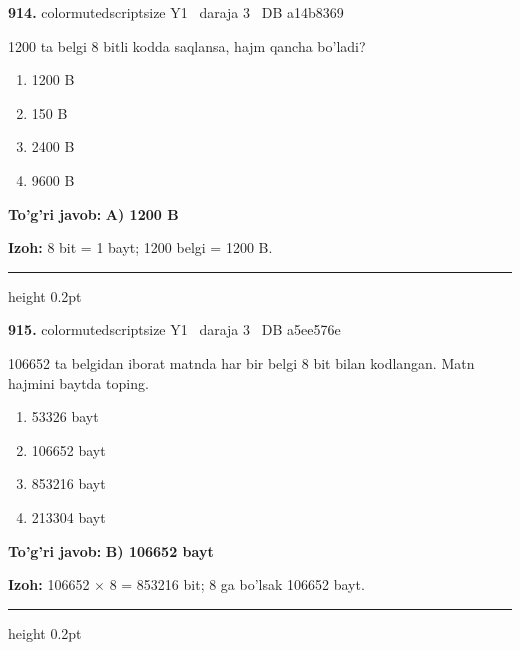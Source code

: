 \documentclass[10pt,a4paper,oneside]{article}
\begin{document}
\noindent\textbf{\color{ink}914.}  {color{muted}scriptsize Y1 \textbullet\ daraja 3 \textbullet\ DB a14b8369}
\par
1200 ta belgi 8 bitli kodda saqlansa, hajm qancha bo'ladi?
\begin{enumerate}[label=\Alph*),leftmargin=9mm]
\item 1200 B
\item 150 B
\item 2400 B
\item 9600 B
\end{enumerate}
\begin{tcolorbox}[enhanced,breakable,colback=teal!4,colframe=teal!50!black,boxrule=0.5pt,arc=1.1mm,left=3mm,right=3mm,top=1.7mm,bottom=1.7mm,before skip=2mm,after skip=2mm]
\textbf{\color{teal}To'g'ri javob:} \textbf{A) 1200 B}
\par\smallskip
\textbf{Izoh:} 8 bit = 1 bayt; 1200 belgi = 1200 B.
\end{tcolorbox}
\vspace{2mm}\hrule height 0.2pt \vspace{3mm}

\noindent\textbf{\color{ink}915.}  {color{muted}scriptsize Y1 \textbullet\ daraja 3 \textbullet\ DB a5ee576e}
\par
106652 ta belgidan iborat matnda har bir belgi 8 bit bilan kodlangan. Matn hajmini baytda toping.
\begin{enumerate}[label=\Alph*),leftmargin=9mm]
\item 53326 bayt
\item 106652 bayt
\item 853216 bayt
\item 213304 bayt
\end{enumerate}
\begin{tcolorbox}[enhanced,breakable,colback=teal!4,colframe=teal!50!black,boxrule=0.5pt,arc=1.1mm,left=3mm,right=3mm,top=1.7mm,bottom=1.7mm,before skip=2mm,after skip=2mm]
\textbf{\color{teal}To'g'ri javob:} \textbf{B) 106652 bayt}
\par\smallskip
\textbf{Izoh:} 106652 \ensuremath{\times} 8 = 853216 bit; 8 ga bo'lsak 106652 bayt.
\end{tcolorbox}
\vspace{2mm}\hrule height 0.2pt \vspace{3mm}
\end{document}
